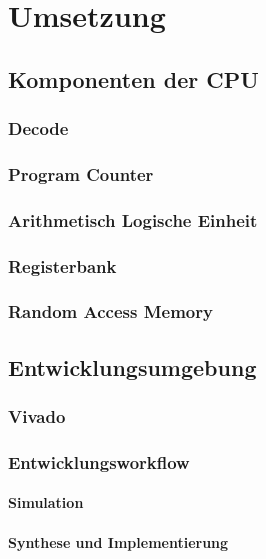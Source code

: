 \chapter{Umsetzung} %
\label{Umsetzung} %

\section{Komponenten der CPU}
\subsection{Decode}
\subsection{Program Counter}
\subsection{Arithmetisch Logische Einheit}
\subsection{Registerbank}
\subsection{Random Access Memory}

\section{Entwicklungsumgebung}
\subsection{Vivado}
\subsection{Entwicklungsworkflow}
\subsubsection{Simulation}
\subsubsection{Synthese und Implementierung}
